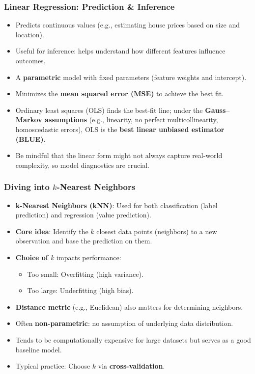 \documentclass[aspectratio=169]{beamer}
\begin{document}
\begin{frame}
    \frametitle{Linear Regression: Prediction \& Inference}
    \begin{itemize}
        \item Predicts continuous values (e.g., estimating house prices based on size and location).
        \item Useful for inference: helps understand how different features influence outcomes.
        \item A \textbf{parametric} model with fixed parameters (feature weights and intercept).
        \item Minimizes the \textbf{mean squared error (MSE)} to achieve the best fit.
        \item Ordinary least squares (OLS) finds the best-fit line; 
              under the \textbf{Gauss--Markov assumptions} (e.g., linearity, no perfect multicollinearity, homoscedastic errors), 
              OLS is the \textbf{best linear unbiased estimator (BLUE)}.
        \item Be mindful that the linear form might not always capture real-world complexity, 
              so model diagnostics are crucial.
    \end{itemize}
\end{frame}

\begin{frame}
    \frametitle{Diving into $k$-Nearest Neighbors}
    \begin{itemize}
        \item \textbf{k-Nearest Neighbors (kNN)}: Used for both classification (label prediction) and regression (value prediction).
        \item \textbf{Core idea}: Identify the $k$ closest data points (neighbors) to a new observation and base the prediction on them.
        \item \textbf{Choice of $k$} impacts performance:
              \begin{itemize}
                  \item Too small: Overfitting (high variance).
                  \item Too large: Underfitting (high bias).
              \end{itemize}
        \item \textbf{Distance metric} (e.g., Euclidean) also matters for determining neighbors.
        \item Often \textbf{non-parametric}: no assumption of underlying data distribution.
        \item Tends to be computationally expensive for large datasets but serves as a good baseline model.
        \item Typical practice: Choose $k$ via \textbf{cross-validation}.
    \end{itemize}
\end{frame}
\end{document}
